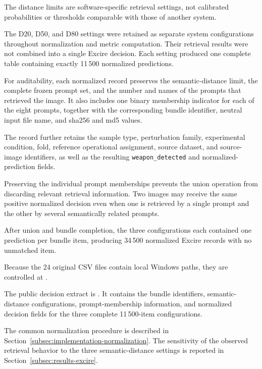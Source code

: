The distance limits are software-specific retrieval settings, not calibrated
probabilities or thresholds comparable with those of another system.

The D20, D50, and D80 settings were retained as separate system configurations
throughout normalization and metric computation. Their retrieval results were
not combined into a single Excire decision. Each setting produced one complete
table containing exactly 11\,500 normalized predictions.

For auditability, each normalized record preserves the semantic-distance limit,
the complete frozen prompt set, and the number and names of the prompts that
retrieved the image. It also includes one binary membership indicator for each
of the eight prompts, together with the corresponding bundle identifier, neutral
input file name, and \gls{sha256} and \gls{md5} values.

The record further retains the sample type, perturbation family, experimental
condition, fold, reference operational assignment, source dataset, and
source-image identifiers, as well as the resulting
\texttt{weapon\_detected} and normalized-prediction fields.

Preserving the individual prompt memberships prevents the union operation from
discarding relevant retrieval information. Two images may receive the same
positive normalized decision even when one is retrieved by a single prompt and
the other by several semantically related prompts.

After union and bundle completion, the three configurations each contained one
prediction per bundle item, producing 34\,500 normalized Excire records with no
unmatched item.

Because the 24 original CSV files contain local Windows paths, they are
controlled at
.

The public decision extract is
.
It contains the bundle identifiers, semantic-distance configurations,
prompt-membership information, and normalized decision fields for the three
complete 11\,500-item configurations.

The common normalization procedure is described in
Section~\ref{subsec:implementation-normalization}. The sensitivity of the
observed retrieval behavior to the three semantic-distance settings is reported
in Section~\ref{subsec:results-excire}.


